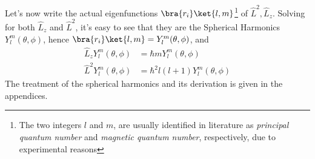 \documentclass[a4paper, 11pt]{book}
\newcommand{\1}{\opr{\mathds{1}}}
\newcommand{\opr}[1]{\hat{#1}}
\theoremstyle{plain}
\begin{document}
	Let's now write the actual eigenfunctions $\bra{r_i}\ket{l,m}$\footnote{The two integers $l$ and $m$, are usually identified in literature as \textit{principal quantum number} and \textit{magnetic quantum number}, respectively, due to experimental reasons} of $\opr{L}^2,\opr{L}_z$. Solving for both $\opr{L}_z$ and $\opr{L}^2$, it's easy to see that they are the Spherical Harmonics $Y^m_l(\theta,\phi)$, hence $\bra{r_i}\ket{l,m}=Y^m_l(\theta,\phi)$, and
	\begin{equation}
		\begin{aligned}
			\opr{L}_zY^m_l(\theta,\phi)&=\hbar mY^m_l(\theta,\phi)\\
			\opr{L}^2Y^m_l(\theta,\phi)&=\hbar^2l(l+1)Y^m_l(\theta,\phi)
		\end{aligned}
		\label{eq:orbangmomeigenf}
	\end{equation}
	The treatment of the spherical harmonics and its derivation is given in the appendices.\\
\end{document}
